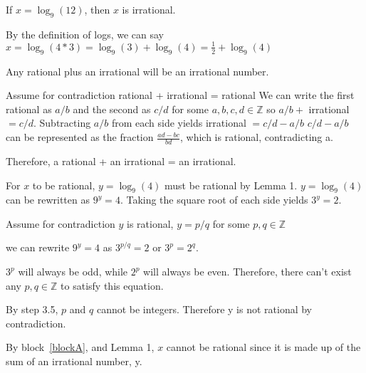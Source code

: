 \documentclass[11pt]{article}
\begin{document}
\begin{problems}

 
\problem
 
\begin{theorem}[Problem 1]
 If $x = \log_9(12)$, then $x$ is irrational.
\end{theorem}
\begin{longFormProof}
 \step By the definition of logs, we can say $x = \log_9(4*3) = \log_9(3) +
         \log_9(4) = \frac{1}{2} + \log_9(4)$
 
 \smallskip
 \hrulefill
 \smallskip
 
       \begin{lemma}
         Any rational plus an irrational will be an irrational number.
       \end{lemma}
 
       \begin{longFormProof}
         \begin{block}[blockL]
            {Assume for contradiction rational + irrational = rational}
         \step We can write the first rational as $a/b$ and the second as $c/d$
            for some $a, b, c, d \in \mathbb{Z}$ so $a/b +$ irrational $=c/d$.
         \step Subtracting $a/b$ from each side yields irrational $=c/d - a/b$
         \step $c/d - a/b$ can be represented as the fraction $\frac{ad-bc}{bd}$, which is rational, contradicting a.
         \end{block}
         \step Therefore, a rational + an irrational = an irrational.
       \end{longFormProof}
 
 \vspace*{-1em}
 \hrulefill
 \smallskip
 
 \step For $x$ to be rational, $y = \log_9(4)$ must be rational by Lemma 1.
 \step $y = \log_9(4)$ can be rewritten as $9^y=4$.
 \step Taking the square root of each side yields $3^y=2$.
 \begin{block}[blockA]
   {Assume for contradiction $y$ is rational, $y=p/q$ for some $p, q \in \mathbb{Z}$}
   
   \step we can rewrite $9^y=4$ as $3^{p/q}=2$ or $3^p=2^q$.
 
   \step $3^p$ will always be odd, while $2^p$ will always be even.
        Therefore, there can't exist any $p, q \in \mathbb{Z}$ to satisfy this equation.
 
   \step By step 3.5, $p$ and $q$ cannot be integers. Therefore y is not rational by contradiction.
 \end{block}
 
 \step By block~\ref{blockA}, and Lemma 1, $x$ cannot be rational
    since it is made up of the sum of an irrational number, y.
\end{longFormProof}
 
\end{problems}
\end{document}

